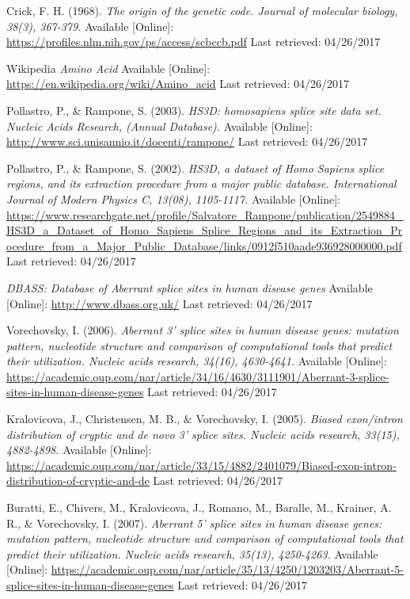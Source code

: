\documentclass[12pt,a4paper]{article}
\begin{document}
	\begin{thebibliography}{9}
		
		Crick, F. H. (1968).
		\textit{The origin of the genetic code. Journal of molecular biology, 38(3), 367-379.}
		Available [Online]: \url{https://profiles.nlm.nih.gov/ps/access/scbccb.pdf}
		Last retrieved: 04/26/2017
		
		Wikipedia
		\textit{Amino Acid}
		Available [Online]: \url{https://en.wikipedia.org/wiki/Amino_acid}
		Last retrieved: 04/26/2017

		Pollastro, P., \& Rampone, S. (2003).
		\textit{ HS3D: homosapiens splice site data set. Nucleic Acids Research, (Annual Database).}
		Available [Online]: \url{ http://www.sci.unisannio.it/docenti/rampone/}
		Last retrieved: 04/26/2017

		Pollastro, P., \& Rampone, S. (2002).
		\textit{ HS3D, a dataset of Homo Sapiens splice regions, and its extraction procedure from a major public database. International Journal of Modern Physics C, 13(08), 1105-1117.}
		Available [Online]: \url{https://www.researchgate.net/profile/Salvatore_Rampone/publication/2549884_HS3D_a_Dataset_of_Homo_Sapiens_Splice_Regions_and_its_Extraction_Procedure_from_a_Major_Public_Database/links/0912f510aade936928000000.pdf}
		Last retrieved: 04/26/2017

		\textit{DBASS: Database of Aberrant splice sites in human disease genes}
		Available [Online]: \url{http://www.dbass.org.uk/}
		Last retrieved: 04/26/2017

		Vorechovsky, I. (2006).
		\textit{Aberrant 3' splice sites in human disease genes: mutation pattern, nucleotide structure and comparison of computational tools that predict their utilization. Nucleic acids research, 34(16), 4630-4641.}
		Available [Online]: \url{https://academic.oup.com/nar/article/34/16/4630/3111901/Aberrant-3-splice-sites-in-human-disease-genes}
		Last retrieved: 04/26/2017

		Kralovicova, J., Christensen, M. B., \& Vorechovsky, I. (2005).
		\textit{ Biased exon/intron distribution of cryptic and de novo 3' splice sites. Nucleic acids research, 33(15), 4882-4898.}
		Available [Online]: \url{https://academic.oup.com/nar/article/33/15/4882/2401079/Biased-exon-intron-distribution-of-cryptic-and-de}
		Last retrieved: 04/26/2017

		Buratti, E., Chivers, M., Kralovicova, J., Romano, M., Baralle, M., Krainer, A. R., \& Vorechovsky, I. (2007). 
		\textit{Aberrant 5' splice sites in human disease genes: mutation pattern, nucleotide structure and comparison of computational tools that predict their utilization. Nucleic acids research, 35(13), 4250-4263.}
		Available [Online]: \url{https://academic.oup.com/nar/article/35/13/4250/1203203/Aberrant-5-splice-sites-in-human-disease-genes}
		Last retrieved: 04/26/2017


\end{thebibliography}
\end{document}
